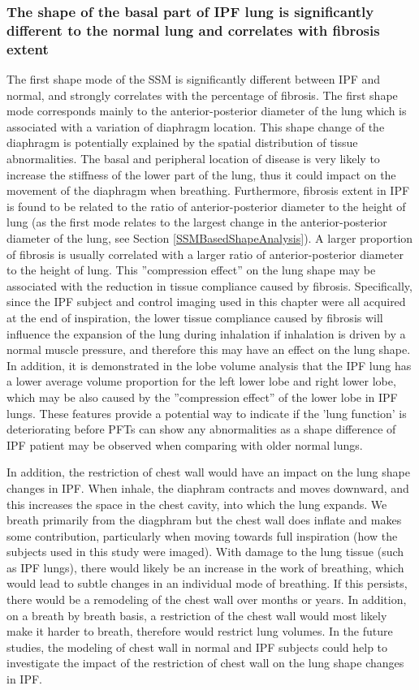 \subsubsection{The shape of the basal part of IPF lung is significantly different to the normal lung and correlates with fibrosis extent}
The first shape mode of the SSM is significantly different between IPF and normal, and strongly correlates with the percentage of fibrosis. The first shape mode corresponds mainly to the anterior-posterior diameter of the lung which is associated with a variation of diaphragm location. This shape change of the diaphragm is potentially explained by the spatial distribution of tissue abnormalities. The basal and peripheral location of disease is very likely to increase the stiffness of the lower part of the lung, thus it could impact on the movement of the diaphragm when breathing. Furthermore, fibrosis extent in IPF is found to be related to the ratio of anterior-posterior diameter to the height of lung (as  the first mode relates to the largest change in the anterior-posterior diameter of the lung, see Section \ref{SSMBasedShapeAnalysis}). A larger proportion of fibrosis is usually correlated with a larger ratio of anterior-posterior diameter to the height of lung. This ''compression effect'' on the lung shape may be associated with the reduction in tissue compliance caused by fibrosis. Specifically, since the IPF subject and control imaging used in this chapter were all acquired at the end of inspiration, the lower tissue compliance caused by fibrosis will influence the expansion of the lung during inhalation if inhalation is driven by a normal muscle pressure, and therefore this may have an effect on the lung shape. In addition, it is demonstrated in the lobe volume analysis that the IPF lung has a lower average volume proportion for the left lower lobe and right lower lobe, which may be also caused by the ''compression effect'' of the lower lobe in IPF lungs. These features provide a potential way to indicate if the 'lung function' is deteriorating before PFTs can show any abnormalities as a shape difference of IPF patient may be observed when comparing with older normal lungs.

In addition, the restriction of chest wall would have an impact on the lung shape changes in IPF. When inhale, the diaphram contracts and moves downward, and this increases the space in the chest cavity, into which the lung expands. We breath primarily from the diagphram but the chest wall does inflate and makes some contribution, particularly when moving towards full inspiration (how the subjects used in this study were imaged). With damage to the lung tissue (such as IPF lungs), there would likely be an increase in the work of breathing, which would lead to subtle changes in an individual mode of breathing. If this persists, there would be a remodeling of the chest wall over months or years. In addition, on a breath by breath basis, a restriction of the chest wall would most likely make it harder to breath, therefore would restrict lung volumes. In the future studies, the modeling of chest wall in normal and IPF subjects could help to investigate the impact of the restriction of chest wall on the lung shape changes in IPF.

